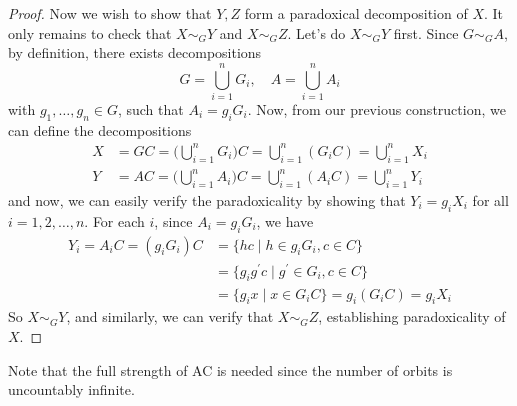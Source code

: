 \begin{proof}
    Now we wish to show that $Y, Z$ form a paradoxical decomposition of $X$. It only remains to check that $X \sim_G Y$ and $X \sim_G Z$. Let's do $X \sim_G Y$ first. Since $G \sim_G A$, by definition, there exists decompositions 
    \begin{equation}
      G = \bigcup_{i=1}^n G_i, \quad A = \bigcup_{i=1}^n A_i
    \end{equation}
    with $g_1, \ldots, g_n \in G$, such that $A_i = g_i G_i$. Now, from our previous construction, we can define the decompositions 
    \begin{align}
      X & = GC = \bigg( \bigcup_{i=1}^n G_i \bigg) C = \bigcup_{i=1}^n (G_i C) = \bigcup_{i=1}^n X_i \\ 
      Y & = AC = \bigg( \bigcup_{i=1}^n A_i \bigg) C = \bigcup_{i=1}^n (A_i C) = \bigcup_{i=1}^n Y_i
    \end{align} 
    and now, we can easily verify the paradoxicality by showing that $Y_i = g_i X_i$ for all $i = 1, 2, \ldots, n$. For each $i$, since $A_i = g_i G_i$, we have 
    \begin{align}
      Y_i = A_i C = (g_i G_i) C & = \{hc \mid h \in g_i G_i, c \in C\} \\ 
                                & = \{g_i g^\prime c \mid g^\prime \in G_i, c \in C \} \\
                                & = \{g_i x \mid x \in G_i C \} = g_i (G_i C) = g_i X_i
    \end{align}
    So $X \sim_G Y$, and similarly, we can verify that $X \sim_G Z$, establishing paradoxicality of $X$. 
  \end{proof}

  Note that the full strength of AC is needed since the number of orbits is uncountably infinite. 

